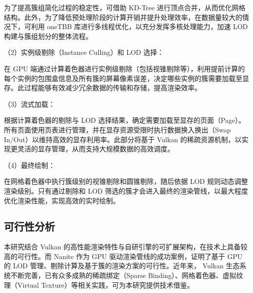 为了提高簇组简化过程的稳定性，可借助 KD-Tree 进行顶点合并，从而优化网格结构。此外，为了降低预处理阶段的计算开销并提升处理效率，在数据量较大的情况下，可利用 oneTBB 库进行多线程优化，以充分发挥多核处理能力，加速 LOD 构建与簇组划分的整体流程。

（2）实例级剔除（Instance Culling）和 LOD 选择：

在 GPU 端通过计算着色器进行实例级剔除（包括视锥剔除等），利用提前计算的每个实例的包围盒信息及所有簇的屏幕像素误差，决定哪些实例的簇需要加载至显存。此过程能够有效减少冗余数据的传输和存储，提高渲染效率。

（3）流式加载：

根据计算着色器的剔除与 LOD 选择结果，确定需要加载至显存的页面（Page）。所有页面使用页表进行管理，并在显存资源受限时执行数据换入换出（Swap In/Out）以维持高效的显存利用率。此部分将基于 Vulkan 的稀疏资源机制，以实现更灵活的显存管理，从而支持大规模数据的高效调度。

（4）最终绘制：

在网格着色器中执行簇级别的视锥剔除和圆锥剔除，随后依据 LOD 规则动态调整渲染级别。只有通过剔除和 LOD 筛选的簇才会进入最终的渲染管线，以最大程度优化渲染性能，实现高效的实时绘制。


\subsection{可行性分析}

本研究结合 Vulkan 的高性能渲染特性与自研引擎的可扩展架构，在技术上具备较高的可行性。而 Nanite 作为 GPU 驱动渲染管线的成功案例，证明了基于 GPU 的 LOD 管理、剔除计算及基于簇的渲染方案的可行性。近年来， Vulkan 生态系统不断完善，已有众多成熟的稀疏绑定（Sparse Binding）、网格着色器、虚拟纹理（Virtual Texture）等相关实践，可为本研究提供技术借鉴。